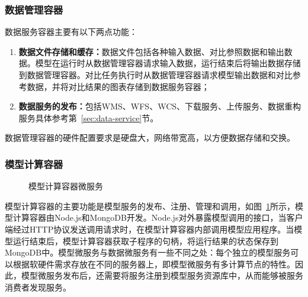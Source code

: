 \subsubsection{数据管理容器}
数据服务容器主要有以下两点功能：
\begin{enumerate}[(1)]
\item \textbf{数据文件存储和缓存：}数据文件包括各种输入数据、对比参照数据和输出数据。模型在运行时从数据管理容器请求输入数据，运行结束后将输出数据存储到数据管理容器。对比任务执行时从数据管理容器请求模型输出数据和对比参考数据，并将对比结果的图表存储到数据服务容器；
\item \textbf{数据服务的发布：}包括WMS、WFS、WCS、下载服务、上传服务、数据重构服务具体参考第~\ref{sec:data-service}节。
\end{enumerate}

数据管理容器的硬件配置要求是硬盘大，网络带宽高，以方便数据存储和交换。



\subsubsection{模型计算容器}
\begin{figure}[!htbp]
    \centering
    \hfill
    \caption{模型计算容器微服务}
    \label{fig:ms-server-microservice}
\end{figure}

模型计算容器的主要功能是模型服务的发布、注册、管理和调用，如图~\ref{fig:ms-server-microservice}所示，模型计算容器由Node.js和MongoDB开发。Node.js对外暴露模型调用的接口，当客户端经过HTTP协议发送调用请求时，在模型计算容器内部调用模型应用程序。当模型运行结束后，模型计算容器获取子程序的句柄，将运行结果的状态保存到MongoDB中。模型微服务与数据微服务有一些不同之处：每个独立的模型服务可以根据软硬件需求存放在不同的服务器上，即模型微服务有多计算节点的特性。因此，模型微服务发布后，还需要将服务注册到模型服务资源库中，从而能够被服务消费者发现服务。

